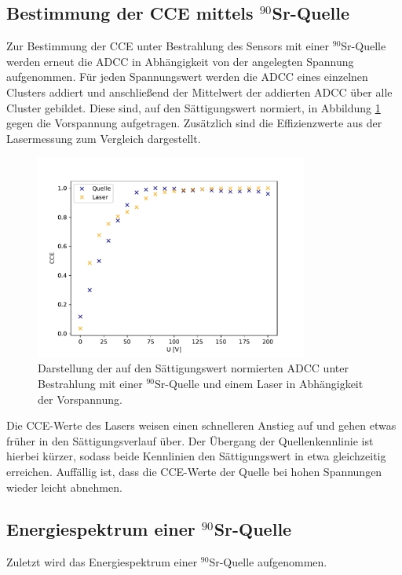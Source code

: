\subsection{Bestimmung der CCE mittels $^{90}$Sr-Quelle}
Zur Bestimmung der CCE unter Bestrahlung des Sensors mit einer $^{90}$Sr-Quelle werden erneut die ADCC in Abhängigkeit von der angelegten Spannung aufgenommen. Für jeden Spannungswert werden die ADCC eines einzelnen Clusters addiert und anschließend der Mittelwert der addierten ADCC über alle Cluster gebildet. Diese sind, auf den Sättigungswert normiert, in Abbildung \ref{fig:KennlinieQuelle} gegen die Vorspannung aufgetragen. Zusätzlich sind die Effizienzwerte aus der Lasermessung zum Vergleich dargestellt.
\label{kap:CCEQ}
\begin{figure}
  \centering
  \includegraphics[width=0.8\textwidth]{plots/Effizienz.pdf}
  \caption{Darstellung der auf den Sättigungswert normierten ADCC unter Bestrahlung mit einer $^{90}$Sr-Quelle und einem Laser in Abhängigkeit der Vorspannung.}
  \label{fig:KennlinieQuelle}
\end{figure}
\FloatBarrier
Die CCE-Werte des Lasers weisen einen schnelleren Anstieg auf und gehen etwas früher in den Sättigungsverlauf über. Der Übergang der Quellenkennlinie ist hierbei kürzer, sodass beide Kennlinien den Sättigungswert in etwa gleichzeitig erreichen. Auffällig ist, dass die CCE-Werte der Quelle bei hohen Spannungen wieder leicht abnehmen.

\subsection{Energiespektrum einer $^{90}$Sr-Quelle}
\label{kap:Quelle}
Zuletzt wird das Energiespektrum einer $^{90}$Sr-Quelle aufgenommen.

